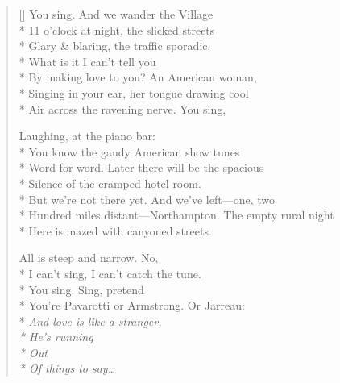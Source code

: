 \label{ch:lovers}
\settowidth{\versewidth}{Hundred miles distant—Northampton. The empty rural night}
\begin{verse}[\versewidth]
You sing. And we wander the Village\\*
11 o'clock at night, the slicked streets\\*
Glary \& blaring, the traffic sporadic.\\*
What is it I can't tell you\\*
By making love to you? An American woman,\\*
Singing in your ear, her tongue drawing cool\\*
Air across the ravening nerve. You sing,

Laughing, at the piano bar:\\*
You know the gaudy American show tunes\\*
Word for word. Later there will be the spacious\\*
Silence of the cramped hotel room.\\*
But we're not there yet. And we've left---one, two\\*
Hundred miles distant---Northampton. The empty rural night\\*
Here is mazed with canyoned streets.

All is steep and narrow. No,\\*
I can't sing, I can't catch the tune.\\*
You sing. Sing, pretend\\*
You're Pavarotti or Armstrong. Or Jarreau:\\*
\textit{And love is like a stranger,\\*
He's running\\*
Out\\*
Of things to say\ldots}
\end{verse}
